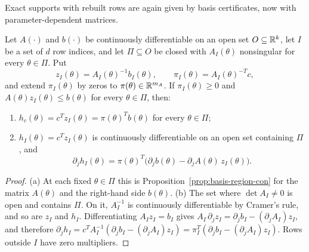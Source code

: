 Exact supports with rebuilt rows are again given by basis certificates,
now with parameter-dependent matrices.

\begin{proposition}\label{prop:rebuilt-basis-con}
Let $A(\cdot)$ and $b(\cdot)$ be continuously differentiable on an open set
$O\subseteq\mathbb{R}^k$, let $I$ be a set of $d$ row indices, and let
$\Pi\subseteq O$ be closed with $A_I(\theta)$ nonsingular for every
$\theta\in\Pi$. Put
\[
 z_I(\theta)=A_I(\theta)^{-1}b_I(\theta),\qquad
 \pi_I(\theta)=A_I(\theta)^{-T}c,
\]
and extend $\pi_I(\theta)$ by zeros to $\pi(\theta)\in\mathbb{R}^{m_A}$. If
$\pi_I(\theta)\ge0$ and $A(\theta)z_I(\theta)\le b(\theta)$ for every
$\theta\in\Pi$, then:
\begin{enumerate}
\item[(a)] $h_c(\theta)=c^Tz_I(\theta)=\pi(\theta)^Tb(\theta)$ for every
 $\theta\in\Pi$;
\item[(b)] $h_I(\theta)=c^Tz_I(\theta)$ is continuously differentiable on
 an open set containing $\Pi$, and
 \begin{equation}\label{eq:lagrangian-derivative-con}
  \partial_jh_I(\theta)=\pi(\theta)^T\bigl(\partial_jb(\theta)
   -\partial_jA(\theta)\,z_I(\theta)\bigr).
 \end{equation}
\end{enumerate}
\end{proposition}

\begin{proof}
(a) At each fixed $\theta\in\Pi$ this is
Proposition~\ref{prop:basis-region-con} for the matrix $A(\theta)$ and the
right-hand side $b(\theta)$. (b) The set where $\det A_I\ne0$ is open and
contains $\Pi$. On it, $A_I^{-1}$ is continuously differentiable by
Cramer's rule, and so are $z_I$ and $h_I$. Differentiating
$A_Iz_I=b_I$ gives
$A_I\,\partial_jz_I=\partial_jb_I-(\partial_jA_I)z_I$, and therefore
$\partial_jh_I=c^TA_I^{-1}(\partial_jb_I-(\partial_jA_I)z_I)
=\pi_I^T(\partial_jb_I-(\partial_jA_I)z_I)$. Rows outside $I$ have zero
multipliers.
\end{proof}

